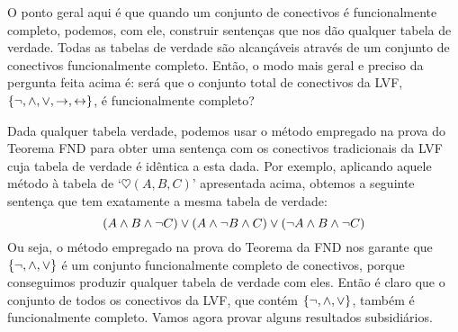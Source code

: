 O ponto geral aqui é que quando um conjunto de conectivos é funcionalmente completo, podemos, com ele, construir sentenças que nos dão qualquer tabela de verdade.
Todas as tabelas de verdade são alcançáveis através de um conjunto de conectivos funcionalmente completo.
Então, o modo mais geral e preciso da pergunta feita acima é: será que o conjunto total de conectivos da LVF, $\{\neg, \wedge, \vee, \rightarrow, \leftrightarrow\}$, é funcionalmente completo?

Dada qualquer tabela verdade, podemos usar o método empregado na prova do Teorema FND para obter uma sentença com os conectivos tradicionais da LVF cuja tabela de verdade é idêntica a esta dada.
Por exemplo, aplicando aquele método à tabela de `$\heartsuit(A, B, C)$' apresentada acima,  obtemos a seguinte sentença que tem exatamente a mesma tabela de verdade:
		$$(A \wedge B \wedge \neg C) \vee (A \wedge \neg B \wedge C) \vee (\neg A \wedge B \wedge \neg C)$$			
Ou seja, o método empregado na prova do Teorema da FND nos garante que $\{\neg, \wedge, \vee \}$ é um conjunto funcionalmente completo de conectivos, porque conseguimos produzir qualquer tabela de verdade com eles.
Então é claro que o conjunto de todos os conectivos da LVF, que contém $\{\neg, \wedge, \vee \}$, também é funcionalmente completo.
Vamos agora provar alguns resultados subsidiários.

